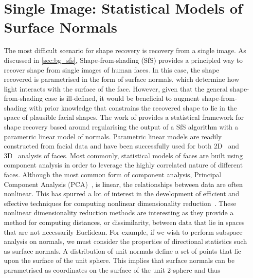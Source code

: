 \chapter{Single Image: Statistical Models of Surface Normals}\label{ch:singl_imag}
\minitoc{}
The most difficult scenario for shape recovery is recovery from a single
image. As discussed in \cref{sec:bg_sfs}, Shape-from-shading (SfS) provides a
principled way to recover shape from single images of human faces. In this case,
the shape recovered is parametrised in the form of surface normals,
which determine how light interacts with the surface of the face.
However, given that the general
shape-from-shading case is ill-defined, it would be beneficial to augment
shape-from-shading with prior knowledge that constrains the recovered shape to
lie in the space of plausible facial shapes. The work of
\citet{smith2006recovering,smith2008facial}
provides a statistical framework for shape recovery based around regularising
the output of a SfS algorithm with a parametric linear model of normals.
Parametric linear models are readily constructed from facial data and have
been successfully used for both 2D~\cite{cootes2001active,turk1991eigenfaces}
and 3D~\cite{enciso1999synthesis,atick1996statistical} analysis of faces.
Most commonly, statistical models of faces are built using component analysis
in order to leverage the highly correlated nature of different faces. Although
the most common form of component analysis,
Principal Component Analysis (PCA)~\cite{pearson1901lines,hotelling1933analysis},
is linear, the relationships between data are often nonlinear.
This has spurred a lot of interest in the development of
efficient and effective techniques for computing nonlinear dimensionality
reduction~\cite{yang2005kpca,goudelis2007class,scholkopf1998nonlinear}. These
nonlinear dimensionality reduction methods are interesting as they provide
a method for computing distances, or dissimilarity, between data that
lie in spaces that are not necessarily Euclidean. For example, if we wish to
perform subspace analysis on normals, we must consider the properties of
directional statistics such as surface normals.
A distribution of unit normals define a set of points that lie upon the
surface of the unit sphere. This implies that surface normals can be
parametrised as coordinates on the surface of the unit 2-sphere and thus
